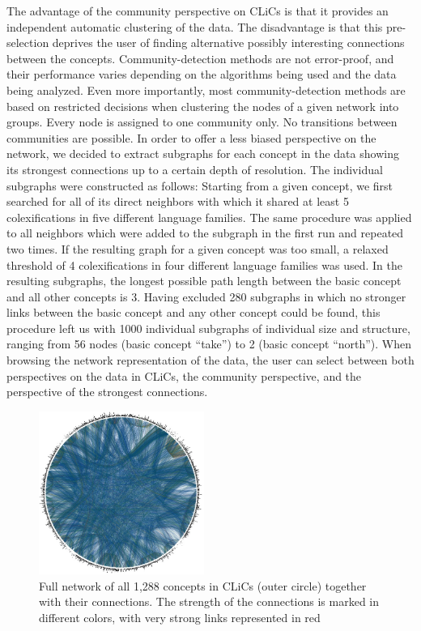 The advantage of the community perspective on CLiCs is that it provides an independent automatic
clustering of the data. The disadvantage is that this pre-selection deprives the user of finding
alternative possibly interesting connections between the concepts. Community-detection methods are not
error-proof, and their performance varies depending on the algorithms being used and the data being analyzed.
Even more importantly, most community-detection methods are based on restricted decisions when
clustering the nodes of a given network into groups. Every node is assigned to one community only.
No transitions between communities are possible. In order to offer a less biased perspective on the
network, we decided to extract subgraphs for each concept in the data showing its strongest
connections up to a certain depth of resolution. The individual subgraphs were constructed as follows: Starting
from a given concept, we first searched for all of its direct neighbors with which it shared at
least 5 colexifications in five different language families. The same procedure was applied to all neighbors
which were added to the subgraph in the first run and repeated two times. If the resulting graph for a given concept was
too small, a relaxed threshold of 4 colexifications in four different language families was used.  
In the resulting subgraphs, the longest possible path length between the basic concept and all other
concepts is 3. Having excluded 280 subgraphs in which no stronger links between the basic concept and any
other concept could be found, this procedure left us with 1000 individual subgraphs of individual
size and structure, ranging from 56 nodes (basic concept ``take'') to 2 (basic concept ``north''). 
When browsing the network representation of the data, the user can select between both perspectives
on the data in CLiCs, the community perspective, and the perspective of the strongest connections.

\begin{figure}[b]
    \centering
   \includegraphics[width=0.48\textwidth]{img/completeNetworkLabels.jpg}
    \caption{Full network of all 1,288 concepts in CLiCs (outer circle) together with their connections. The strength of the connections is marked in different colors, with very strong links represented in red}
    \label{fig:clics_full}
\end{figure}
